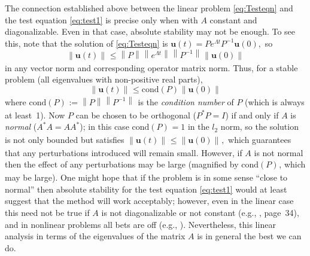 \documentclass[12pt]{article}
\renewcommand{\u}{\mathbf{u}}
\newcommand{\norm}[2][{}]{\ensuremath{\left\|{#2}\right\|_{#1}}}
\newcommand{\cond}[2][{}]{\ensuremath{\text{cond}\!\left({#2}\right)}_{#1}}
\begin{document}
The connection established above between the linear problem \eqref{eq:Testeqn}
and the test equation \eqref{eq:test1} is precise only when with $A$
constant and diagonalizable.  Even in that case, absolute stability may not be
enough.  To see this, note that the solution of \eqref{eq:Testeqn} is 
\begin{math}
  \u(t) = Pe^{\Lambda t}P^{-1}\u(0),
\end{math}
so
\begin{equation}
  \norm{\u(t)} \le \norm{P} \norm{e^{\Lambda t}} \norm{P^{-1}} \norm{\u(0)}
\end{equation}
in any vector norm and corresponding operator matrix norm.  Thus, for a stable 
problem (all eigenvalues with non-positive real parts), 
\begin{equation}
  \norm{\u(t)} \le \cond{P} \norm{\u(0)}
\end{equation}
where $\cond{P}:=\norm{P}\norm{P^{-1}}$ is the \emph{condition number} of $P$
(which is always at least~1).  Now $P$ can be chosen to be orthogonal
($P^*P=I$) if and only if $A$ is \emph{normal} ($A^*A=AA^*$); in this case
$\cond{P}=1$ in the $l_2$ norm, so the solution is not only bounded but
satisfies
\begin{math}
  \norm{\u(t)} \le \norm{\u(0)},
\end{math}
which guarantees that any perturbations introduced will remain small.
However, if $A$ is not normal then the effect of any perturbations may be
large (magnified by $\cond{P}$, which may be large).
One might hope that if the problem is in some sense ``close to normal'' 
then absolute stability for the test equation \eqref{eq:test1} would at
least suggest that the method will work acceptably; however, even in the
linear case this need not be true if $A$ is not diagonalizable or not constant
(e.g., \cite{Ascher_Petzold98}, page~34), and in nonlinear problems all bets
are off (e.g., \cite{Lambert91}).  Nevertheless, this linear analysis in terms
of the eigenvalues of the matrix $A$ is in general the best we can do.
\end{document}
